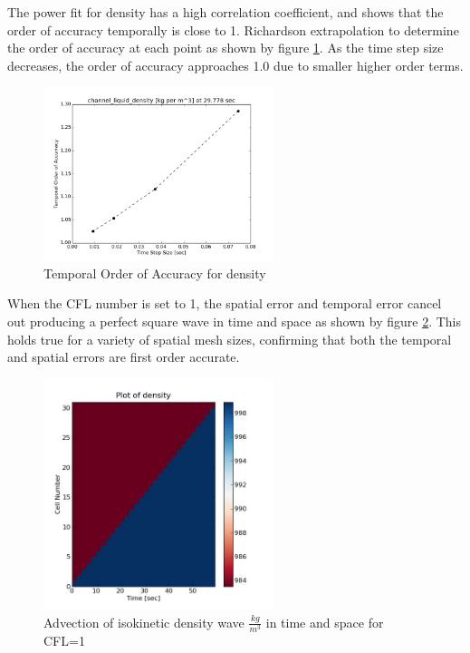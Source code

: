     The power fit for density has a high correlation coefficient, and
    shows that the order of accuracy temporally is close to 1. Richardson
    extrapolation to determine the order of accuracy at each point as shown by 
    figure \ref{fig:Temporal_Order_Of_Accuracy_rho}. As the time step size
    decreases, the order of accuracy approaches 1.0 due to smaller higher order
    terms. 
        
    
    \begin{figure}[!h]
    	\centering
    	\includegraphics[width=0.60\textwidth]{images/Isokinetic_Advection/Temoral_Order_Of_Accuracy_rho}
    	\caption{Temporal Order of Accuracy for density}
    	\label{fig:Temporal_Order_Of_Accuracy_rho}
    \end{figure}
    
    When the CFL number is set to 1, the spatial error and temporal error
    cancel out producing a perfect square wave in time and space as shown by
    figure \ref{fig:density_2D}. This holds true for a variety of spatial
    mesh sizes, confirming that both the temporal and spatial errors are first
    order accurate. 
    
    \begin{figure}[!h]
    	\centering
    	\includegraphics[width=0.60\textwidth]{images/Isokinetic_Advection/density_2D}
    	\caption{Advection of isokinetic density wave $\frac{kg}{m^{3}}$ in time
    	and space for CFL=1}
    	\label{fig:density_2D}
    \end{figure}









